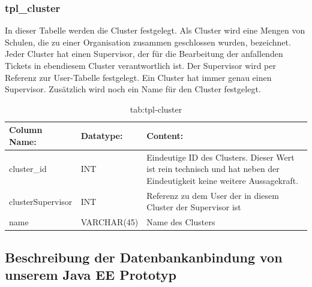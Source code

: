\newpage

\subsubsection{tpl\_cluster}

In dieser Tabelle werden die Cluster festgelegt. Als Cluster wird eine Mengen von Schulen, die zu einer Organisation zusammen geschlossen wurden, bezeichnet. Jeder Cluster hat einen Supervisor, der für die Bearbeitung der anfallenden Tickets in ebendiesem Cluster verantwortlich ist.
Der Supervisor wird per Referenz zur User-Tabelle festgelegt. Ein Cluster hat immer genau einen Supervisor. Zusätzlich wird noch ein Name für den Cluster festgelegt.

\begin{table}[h]
	\begin{tabular}{|p{3.5cm}|p{4cm}|p{6.2cm}|}
		\hline
		\textbf{Column Name:} & \textbf{Datatype:} & \textbf{Content:}\\
		\hline
		cluster\_id & INT & Eindeutige ID des Clusters. Dieser Wert ist rein technisch und hat neben der Eindeutigkeit keine weitere Aussagekraft.\\
		\hline
		clusterSupervisor & INT & Referenz zu dem User der in diesem Cluster der Supervisor ist\\
		\hline
		name & VARCHAR(45) & Name des Clusters\\
		\hline
	\end{tabular}
	\caption{tab:tpl-cluster}
\end{table}
\label{tab:tpl_cluster}

\newpage

\subsection{Beschreibung der Datenbankanbindung von unserem Java EE Prototyp}

